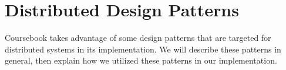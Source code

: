 \section{Distributed Design Patterns}

Coursebook takes advantage of some design patterns that are targeted for
distributed systems in its implementation. We will describe these patterns in
general, then explain how we utilized these patterns in our implementation.




